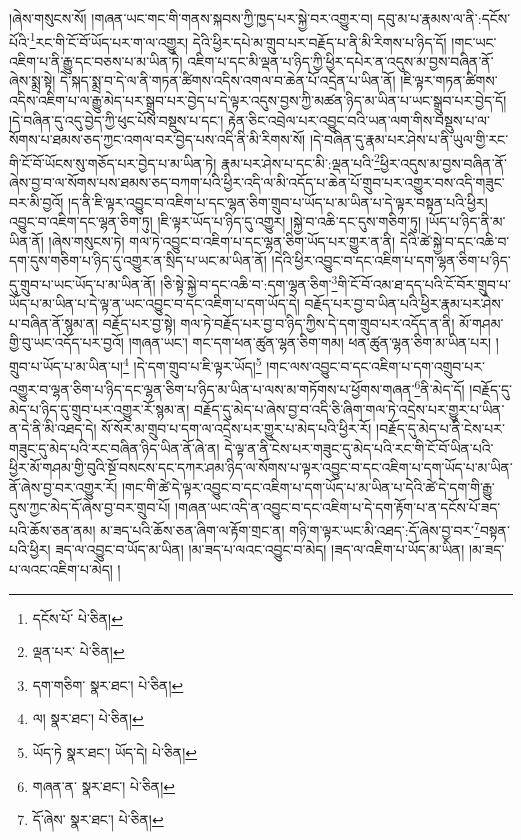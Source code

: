 །ཞེས་གསུངས་སོ། །གཞན་ཡང་གང་གི་གནས་སྐབས་ཀྱི་ཁྱད་པར་སྐྱེ་བར་འགྱུར་བ། དབུ་མ་པ་རྣམས་ལ་ནི་:དངོས་པོའི་\footnote{དངོས་པོ་  པེ་ཅིན། }རང་གི་ངོ་བོ་ཡོད་པར་ག་ལ་འགྱུར། དེའི་ཕྱིར་དཔེ་མ་གྲུབ་པར་བརྗོད་པ་ནི་མི་རིགས་པ་ཉིད་དོ། །གང་ཡང་འཇིག་པ་ནི་རྒྱུ་དང་བཅས་པ་མ་ཡིན་ཏེ། འཇིག་པ་དང་མི་ལྡན་པ་ཉིད་ཀྱི་ཕྱིར་དཔེར་ན་འདུས་མ་བྱས་བཞིན་ནོ་ཞེས་སྨྲ་སྟེ། དེ་སྐད་སྨྲ་བ་དེ་ལ་ནི་གཏན་ཚིགས་འདིས་འགལ་བ་ཆེན་པོ་འདྲེན་པ་ཡིན་ནོ། །ཇི་ལྟར་གཏན་ཚིགས་འདིས་འཇིག་པ་ལ་རྒྱུ་མེད་པར་སྒྲུབ་པར་བྱེད་པ་དེ་ལྟར་འདུས་བྱས་ཀྱི་མཚན་ཉིད་མ་ཡིན་པ་ཡང་སྒྲུབ་པར་བྱེད་དོ། །དེ་བཞིན་དུ་འདུ་བྱེད་ཀྱི་ཕུང་པོས་བསྡུས་པ་དང་། རྟེན་ཅིང་འབྲེལ་པར་འབྱུང་བའི་ཡན་ལག་གིས་བསྡུས་པ་ལ་སོགས་པ་ཐམས་ཅད་ཀྱང་འགལ་བར་བྱེད་པས་འདི་ནི་མི་རིགས་སོ། །དེ་བཞིན་དུ་རྣམ་པར་ཤེས་པ་ནི་ཡུལ་གྱི་རང་གི་ངོ་བོ་ཡོངས་སུ་གཅོད་པར་བྱེད་པ་མ་ཡིན་ཏེ། རྣམ་པར་ཤེས་པ་དང་མི་:ལྡན་པའི་\footnote{ལྡན་པར་  པེ་ཅིན། }ཕྱིར་འདུས་མ་བྱས་བཞིན་ནོ་ཞེས་བྱ་བ་ལ་སོགས་པས་ཐམས་ཅད་བཀག་པའི་ཕྱིར་འདི་ལ་མི་འདོད་པ་ཆེན་པོ་གྲུབ་པར་འགྱུར་བས་འདི་གཟུང་བར་མི་བྱའོ། །ད་ནི་ཇི་ལྟར་འབྱུང་བ་འཇིག་པ་དང་ལྷན་ཅིག་གྲུབ་པ་ཡོད་པ་མ་ཡིན་པ་དེ་ལྟར་བསྟན་པའི་ཕྱིར། འབྱུང་བ་འཇིག་དང་ལྷན་ཅིག་ཏུ། །ཇི་ལྟར་ཡོད་པ་ཉིད་དུ་འགྱུར། །སྐྱེ་བ་འཆི་དང་དུས་གཅིག་ཏུ། །ཡོད་པ་ཉིད་ནི་མ་ཡིན་ནོ། །ཞེས་གསུངས་ཏེ། གལ་ཏེ་འབྱུང་བ་འཇིག་པ་དང་ལྷན་ཅིག་ཡོད་པར་གྱུར་ན་ནི། དེའི་ཚེ་སྐྱེ་བ་དང་འཆི་བ་དག་དུས་གཅིག་པ་ཉིད་དུ་འགྱུར་ན་སྲིད་པ་ཡང་མ་ཡིན་ནོ། །དེའི་ཕྱིར་འབྱུང་བ་དང་འཇིག་པ་དག་ལྷན་ཅིག་པ་ཉིད་དུ་གྲུབ་པ་ཡང་ཡོད་པ་མ་ཡིན་ནོ། །ཅི་སྟེ་སྐྱེ་བ་དང་འཆི་བ་:དག་ལྷན་ཅིག་\footnote{དག་གཅིག་  སྣར་ཐང་།  པེ་ཅིན། }གི་ངོ་བོ་འམ་ཐ་དད་པའི་ངོ་བོར་གྲུབ་པ་ཡོད་པ་མ་ཡིན་པ་དེ་ལྟ་ན་ཡང་འབྱུང་བ་དང་འཇིག་པ་དག་ཡོད་དེ། བརྗོད་པར་བྱ་བ་ཡིན་པའི་ཕྱིར་རྣམ་པར་ཤེས་པ་བཞིན་ནོ་སྙམ་ན། བརྗོད་པར་བྱ་སྟེ། གལ་ཏེ་བརྗོད་པར་བྱ་བ་ཉིད་ཀྱིས་དེ་དག་གྲུབ་པར་འདོད་ན་ནི། མོ་གཤམ་གྱི་བུ་ཡང་འདོད་པར་བྱའོ། །གཞན་ཡང་། གང་དག་ཕན་ཚུན་ལྷན་ཅིག་གམ། ཕན་ཚུན་ལྷན་ཅིག་མ་ཡིན་པར། །གྲུབ་པ་ཡོད་པ་མ་ཡིན་པ།\footnote{ལ།  སྣར་ཐང་།  པེ་ཅིན། } །དེ་དག་གྲུབ་པ་ཇི་ལྟར་ཡོད།\footnote{ཡོད་ཏེ  སྣར་ཐང་། ཡོད་དེ།  པེ་ཅིན། } །གང་ལས་འབྱུང་བ་དང་འཇིག་པ་དག་འགྲུབ་པར་འགྱུར་བ་ལྷན་ཅིག་པ་ཉིད་དང་ལྷན་ཅིག་པ་ཉིད་མ་ཡིན་པ་ལས་མ་གཏོགས་པ་ཕྱོགས་གཞན་\footnote{གཞན་ན་  སྣར་ཐང་།  པེ་ཅིན། }ནི་མེད་དོ། །བརྗོད་དུ་མེད་པ་ཉིད་དུ་གྲུབ་པར་འགྱུར་རོ་སྙམ་ན། བརྗོད་དུ་མེད་པ་ཞེས་བྱ་བ་འདི་ཅི་ཞིག་གལ་ཏེ་འདྲེས་པར་གྱུར་པ་ཡིན་ན་དེ་ནི་མི་འཐད་དེ། སོ་སོར་མ་གྲུབ་པ་དག་ལ་འདྲེས་པར་གྱུར་པ་མེད་པའི་ཕྱིར་རོ། །བརྗོད་དུ་མེད་པ་ནི་ངེས་པར་གཟུང་དུ་མེད་པའི་རང་བཞིན་ཉིད་ཡིན་ནོ་ཞེ་ན། དེ་ལྟ་ན་ནི་ངེས་པར་གཟུང་དུ་མེད་པའི་རང་གི་ངོ་བོ་ཡིན་པའི་ཕྱིར་མོ་གཤམ་གྱི་བུའི་སྔོ་བསངས་དང་དཀར་ཤམ་ཉིད་ལ་སོགས་པ་ལྟར་འབྱུང་བ་དང་འཇིག་པ་དག་ཡོད་པ་མ་ཡིན་ནོ་ཞེས་བྱ་བར་འགྱུར་རོ། །གང་གི་ཚེ་དེ་ལྟར་འབྱུང་བ་དང་འཇིག་པ་དག་ཡོད་པ་མ་ཡིན་པ་དེའི་ཚེ་དེ་དག་གི་རྒྱུ་དུས་ཀྱང་མེད་དོ་ཞེས་བྱ་བར་གྲུབ་པོ། །གཞན་ཡང་འདི་ན་འབྱུང་བ་དང་འཇིག་པ་དེ་དག་རྟོག་པ་ན་དངོས་པོ་ཟད་པའི་ཆོས་ཅན་ནམ། མ་ཟད་པའི་ཆོས་ཅན་ཞིག་ལ་རྟོག་གྲང་ན། གཉི་ག་ལྟར་ཡང་མི་འཐད་:དོ་ཞེས་བྱ་བར་\footnote{དོ་ཞེས་  སྣར་ཐང་།  པེ་ཅིན། }བསྟན་པའི་ཕྱིར། ཟད་ལ་འབྱུང་བ་ཡོད་མ་ཡིན། །མ་ཟད་པ་ལའང་འབྱུང་བ་མེད། །ཟད་ལ་འཇིག་པ་ཡོད་མ་ཡིན། །མ་ཟད་པ་ལའང་འཇིག་པ་མེད། །

